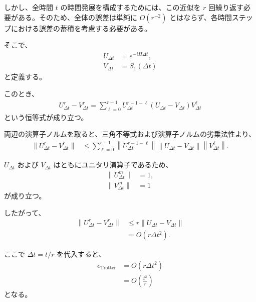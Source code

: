 \documentclass[a4paper,10.5pt]{article}
\numberwithin{equation}{section}
\begin{document}
しかし、全時間 $t$ の時間発展を構成するためには、この近似を $r$ 回繰り返す必要がある。そのため、全体の誤差は単純に $O(r^{-2})$ とはならず、各時間ステップにおける誤差の蓄積を考慮する必要がある。

そこで、
\begin{align}
    U_{\Delta t}
    &=
    e^{-iH\Delta t},
    \\
    V_{\Delta t}
    &=
    S_1(\Delta t)
\end{align}
と定義する。

このとき、
\begin{align}
    U_{\Delta t}^{r}
    -
    V_{\Delta t}^{r}
    =
    \sum_{\ell=0}^{r-1}
    U_{\Delta t}^{r-1-\ell}
    \left(
        U_{\Delta t}-V_{\Delta t}
    \right)
    V_{\Delta t}^{\ell}
\end{align}
という恒等式が成り立つ。

両辺の演算子ノルムを取ると、三角不等式および演算子ノルムの劣乗法性より、
\begin{align}
    \left\|
        U_{\Delta t}^{r}
        -
        V_{\Delta t}^{r}
    \right\|
    &\leq
    \sum_{\ell=0}^{r-1}
    \left\|
        U_{\Delta t}^{r-1-\ell}
    \right\|
    \left\|
        U_{\Delta t}-V_{\Delta t}
    \right\|
    \left\|
        V_{\Delta t}^{\ell}
    \right\|.
\end{align}

$U_{\Delta t}$ および $V_{\Delta t}$ はともにユニタリ演算子であるため、
\begin{align}
    \left\|
        U_{\Delta t}^{m}
    \right\|
    &=
    1,
    \\
    \left\|
        V_{\Delta t}^{m}
    \right\|
    &=
    1
\end{align}
が成り立つ。

したがって、
\begin{align}
    \left\|
        U_{\Delta t}^{r}
        -
        V_{\Delta t}^{r}
    \right\|
    &\leq
    r
    \left\|
        U_{\Delta t}-V_{\Delta t}
    \right\|
    \\
    &=
    O\left(
        r\Delta t^2
    \right).
\end{align}

ここで $\Delta t=t/r$ を代入すると、
\begin{align}
    \epsilon_{\mathrm{Trotter}}
    &=
    O\left(
        r\Delta t^2
    \right)
    \\
    &=
    O\left(
        \frac{t^2}{r}
    \right)
\end{align}
となる。
\end{document}
